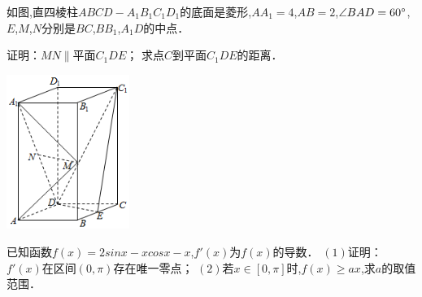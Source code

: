 \documentclass[windows,list]{BHCexam}
\begin{document}
\begin{groups}
\begin{questions}[t]
\begin{minipage}{\linewidth}
\begin{solution}{6cm}
\end{solution}
\end{minipage}
\vfill
\begin{minipage}{\linewidth}
\question[12] 如图,直四棱柱$ABCD-A _{1} B _{1} C _{1} D _{1}$的底面是菱形,$AA _{1} =4$,$AB=2$,$ \angle BAD=60^{\small \circ}$,$E$,$M$,$N$分别是$BC$,$BB _{1}$,$A _{1} D$的中点．
\begin{subquestions}
    \subquestion 证明：$MN \parallel $平面$C _{1} DE$；
    \subquestion 求点$C$到平面$C _{1} DE$的距离．
\end{subquestions}
\begin{center}
\includegraphics[width=4cm]{./rOqrX8AOkhQtAGTSvgdyU0mzeH3pIfTp.png}
\vspace{0.5cm}
\end{center}
\begin{solution}{6cm}

\end{solution}
\end{minipage}
\vfill
\begin{minipage}{\linewidth}
\question[12] 已知函数$f(x)=2sin x-xcos x-x$,$f ' (x)$为$f(x)$的导数．  $(1)$证明：$f ' (x)$在区间$(0 ,  \pi )$存在唯一零点； $(2)$若$x \in [0 ,  \pi ]$时,$f(x)\geqslant ax$,求$a$的取值范围．
\begin{solution}{6cm}


\end{solution}
\end{minipage}
\end{questions}
\end{groups}
\end{document}
